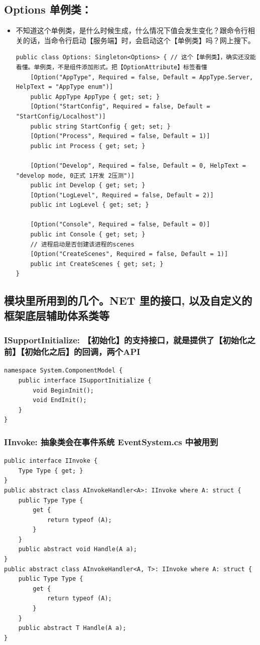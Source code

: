 \documentclass[9pt, b5paper]{article}
\begin{document}
\subsection{Options 单例类：}
\label{sec-1-2}
\begin{itemize}
\item 不知道这个单例类，是什么时候生成，什么情况下值会发生变化？跟命令行相关的话，当命令行启动【服务端】时，会启动这个【单例类】吗？网上搜下。
\begin{verbatim}
public class Options: Singleton<Options> { // 这个【单例类】，确实还没能看懂。单例类，不是组件添加形式。把【OptionAttribute】标签看懂
    [Option("AppType", Required = false, Default = AppType.Server, HelpText = "AppType enum")]
    public AppType AppType { get; set; }
    [Option("StartConfig", Required = false, Default = "StartConfig/Localhost")]
    public string StartConfig { get; set; }
    [Option("Process", Required = false, Default = 1)]
    public int Process { get; set; }

    [Option("Develop", Required = false, Default = 0, HelpText = "develop mode, 0正式 1开发 2压测")]
    public int Develop { get; set; }
    [Option("LogLevel", Required = false, Default = 2)]
    public int LogLevel { get; set; }

    [Option("Console", Required = false, Default = 0)]
    public int Console { get; set; }
    // 进程启动是否创建该进程的scenes
    [Option("CreateScenes", Required = false, Default = 1)]
    public int CreateScenes { get; set; }
}
\end{verbatim}
\end{itemize}

\subsection{模块里所用到的几个。NET 里的接口, 以及自定义的框架底层辅助体系类等}
\label{sec-1-3}
\subsubsection{ISupportInitialize: 【初始化】的支持接口，就是提供了【初始化之前】【初始化之后】的回调，两个API}
\label{sec-1-3-1}
\begin{verbatim}
namespace System.ComponentModel {
    public interface ISupportInitialize {
        void BeginInit();
        void EndInit();
    }
}
\end{verbatim}
\subsubsection{IInvoke: 抽象类会在事件系统 EventSystem.cs 中被用到}
\label{sec-1-3-2}
\begin{verbatim}
public interface IInvoke {
    Type Type { get; }
}
public abstract class AInvokeHandler<A>: IInvoke where A: struct {
    public Type Type {
        get {
            return typeof (A);
        }
    }
    public abstract void Handle(A a);
}
public abstract class AInvokeHandler<A, T>: IInvoke where A: struct {
    public Type Type {
        get {
            return typeof (A);
        }
    }
    public abstract T Handle(A a);
}
\end{verbatim}
\end{document}

